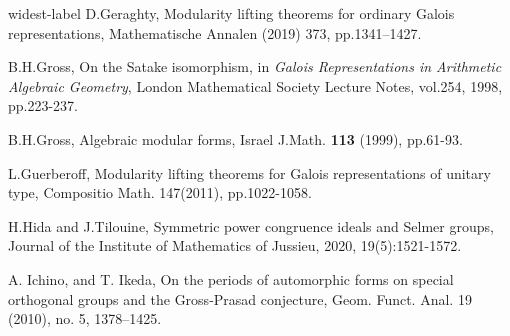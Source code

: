\documentclass[12pt,oneside,reqno]{amsart}
\theoremstyle{plain}
\begin{document}
\begin{thebibliography}{widest-label}
		D.Geraghty,
		Modularity lifting theorems for ordinary Galois representations,
		Mathematische Annalen (2019) 373,
		pp.1341–1427.
		
		
		
		
		
		
		B.H.Gross,
		On the Satake isomorphism,
		in
		\textit{Galois Representations in Arithmetic Algebraic Geometry},
		London Mathematical Society Lecture Notes,
		vol.254,
		1998,
		pp.223-237.
		
		
		
		
		B.H.Gross,
		Algebraic modular forms,
		Israel J.Math. \textbf{113} (1999),
		pp.61-93.
		
		
		
		
		
		
		
		
		
		
		L.Guerberoff,
		Modularity lifting theorems for Galois representations of unitary type,
		Compositio Math. 147(2011),
		pp.1022-1058.
		
		
		
		
		
		H.Hida and J.Tilouine,
		Symmetric power congruence ideals and Selmer groups,
		Journal of the Institute of Mathematics of Jussieu, 2020, 19(5):1521-1572.
		
		
		
		
		
		A. Ichino, and T. Ikeda,
		On the periods of automorphic forms on special orthogonal groups and the Gross-Prasad conjecture,
		Geom. Funct. Anal. 19 (2010), no. 5, 1378–1425.
		
		
		

\end{thebibliography}
\end{document}
